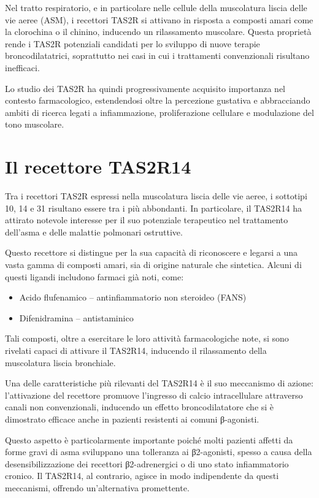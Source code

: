 \documentclass[12pt, a4paper]{book}
\begin{document}
Nel tratto respiratorio, e in particolare nelle cellule della muscolatura liscia delle vie aeree (ASM), i recettori TAS2R si attivano in risposta a composti amari come la clorochina o il chinino, inducendo un rilassamento muscolare. Questa proprietà rende i TAS2R potenziali candidati per lo sviluppo di nuove terapie broncodilatatrici, soprattutto nei casi in cui i trattamenti convenzionali risultano inefficaci.

Lo studio dei TAS2R ha quindi progressivamente acquisito importanza nel contesto farmacologico, estendendosi oltre la percezione gustativa e abbracciando ambiti di ricerca legati a infiammazione, proliferazione cellulare e modulazione del tono muscolare.

\newpage
\chapter{Il recettore TAS2R14}

Tra i recettori TAS2R espressi nella muscolatura liscia delle vie aeree, i sottotipi 10, 14 e 31 risultano essere tra i più abbondanti. In particolare, il TAS2R14 ha attirato notevole interesse per il suo potenziale terapeutico nel trattamento dell'asma e delle malattie polmonari ostruttive.

Questo recettore si distingue per la sua capacità di riconoscere e legarsi a una vasta gamma di composti amari, sia di origine naturale che sintetica. Alcuni di questi ligandi includono farmaci già noti, come:
\begin{itemize}
    \item Acido flufenamico – antinfiammatorio non steroideo (FANS)
    \item Difenidramina – antistaminico
\end{itemize}

Tali composti, oltre a esercitare le loro attività farmacologiche note, si sono rivelati capaci di attivare il TAS2R14, inducendo il rilassamento della muscolatura liscia bronchiale.

Una delle caratteristiche più rilevanti del TAS2R14 è il suo meccanismo di azione: l’attivazione del recettore promuove l’ingresso di calcio intracellulare attraverso canali non convenzionali, inducendo un effetto broncodilatatore che si è dimostrato efficace anche in pazienti resistenti ai comuni β-agonisti.

Questo aspetto è particolarmente importante poiché molti pazienti affetti da forme gravi di asma sviluppano una tolleranza ai β2-agonisti, spesso a causa della desensibilizzazione dei recettori β2-adrenergici o di uno stato infiammatorio cronico. Il TAS2R14, al contrario, agisce in modo indipendente da questi meccanismi, offrendo un'alternativa promettente.
\end{document}
